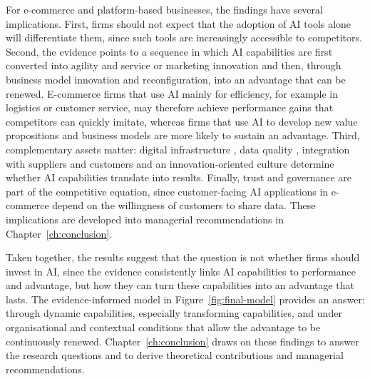 For e-commerce and platform-based businesses, the findings have several implications. First, firms should not expect that the adoption of AI tools alone will differentiate them, since such tools are increasingly accessible to competitors. Second, the evidence points to a sequence in which AI capabilities are first converted into agility and service or marketing innovation and then, through business model innovation and reconfiguration, into an advantage that can be renewed. E-commerce firms that use AI mainly for efficiency, for example in logistics or customer service, may therefore achieve performance gains that competitors can quickly imitate, whereas firms that use AI to develop new value propositions and business models are more likely to sustain an advantage. Third, complementary assets matter: digital infrastructure , data quality , integration with suppliers and customers  and an innovation-oriented culture  determine whether AI capabilities translate into results. Finally, trust and governance are part of the competitive equation, since customer-facing AI applications in e-commerce depend on the willingness of customers to share data. These implications are developed into managerial recommendations in Chapter~\ref{ch:conclusion}.

Taken together, the results suggest that the question is not whether firms should invest in AI, since the evidence consistently links AI capabilities to performance and advantage, but how they can turn these capabilities into an advantage that lasts. The evidence-informed model in Figure~\ref{fig:final-model} provides an answer: through dynamic capabilities, especially transforming capabilities, and under organisational and contextual conditions that allow the advantage to be continuously renewed. Chapter~\ref{ch:conclusion} draws on these findings to answer the research questions and to derive theoretical contributions and managerial recommendations.
